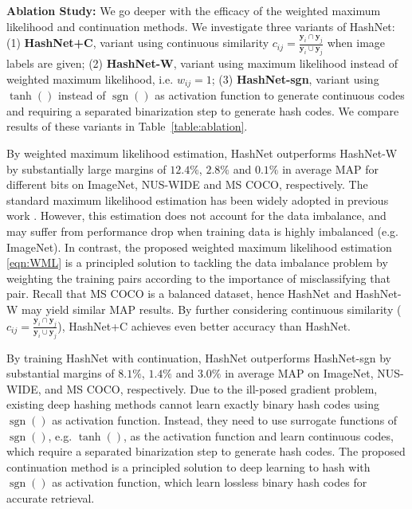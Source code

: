 \documentclass[10pt,twocolumn,letterpaper]{article}
\begin{document}
\textbf{Ablation Study:}
We go deeper with the efficacy of the weighted maximum likelihood and continuation methods. We investigate three variants of HashNet: (1) \textbf{HashNet+C}, variant using continuous similarity ${c_{ij}} = \frac{{{{\bm{y}}_i} \cap {{\bm{y}}_j}}}{{{{\bm{y}}_i} \cup {{\bm{y}}_j}}}$ when image labels are given; (2) \textbf{HashNet-W}, variant using maximum likelihood instead of weighted maximum likelihood, i.e. $w_{ij} = 1$; (3) \textbf{HashNet-sgn}, variant using $\operatorname{tanh}()$ instead of $\operatorname{sgn}()$ as activation function to generate continuous codes and requiring a separated binarization step to generate hash codes. We compare results of these variants in Table~\ref{table:ablation}.

By weighted maximum likelihood estimation, HashNet outperforms HashNet-W by substantially large margins of $12.4\%$, $2.8\%$ and $0.1\%$ in average MAP for different bits on ImageNet, NUS-WIDE and MS COCO, respectively. The standard maximum likelihood estimation has been widely adopted in previous work \cite{cite:AAAI14CNNH,cite:AAAI16DHN}. However, this estimation does not account for the data imbalance, and may suffer from performance drop when training data is highly imbalanced (e.g. ImageNet). In contrast, the proposed weighted maximum likelihood estimation \eqref{eqn:WML} is a principled solution to tackling the data imbalance problem by weighting the training pairs according to the importance of misclassifying that pair. Recall that MS COCO is a balanced dataset, hence HashNet and HashNet-W may yield similar MAP results. By further considering continuous similarity (${c_{ij}} = \frac{{{{\bm{y}}_i} \cap {{\bm{y}}_j}}}{{{{\bm{y}}_i} \cup {{\bm{y}}_j}}}$), HashNet+C achieves even better accuracy than HashNet.

By training HashNet with continuation, HashNet outperforms HashNet-sgn by substantial margins of $8.1\%$, $1.4\%$ and $3.0\%$ in average MAP on ImageNet, NUS-WIDE, and MS COCO, respectively. Due to the ill-posed gradient problem, existing deep hashing methods cannot learn exactly binary hash codes using $\operatorname{sgn}()$ as activation function. Instead, they need to use surrogate functions of $\operatorname{sgn}()$, e.g. $\operatorname{tanh}()$, as the activation function and learn continuous codes, which require a separated binarization step to generate hash codes. 
The proposed continuation method is a principled solution to deep learning to hash with $\operatorname{sgn}()$ as activation function, which learn lossless binary hash codes for accurate retrieval.
\end{document}
